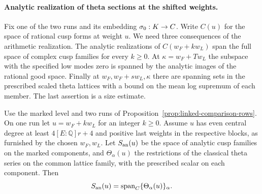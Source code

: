 \paragraph{Analytic realization of theta sections at the shifted weights.}\label{par:shifted-theta}
Fix one of the two runs and its embedding \(\sigma_0:K\to\C\).
Write \(C(u)\) for the space of rational cusp forms at weight \(u\).
We need three consequences of the arithmetic realization. The analytic realizations of \(C(w_F+k w_L)\) span the full space of complex cusp families for
every \(k\ge0\). At \(\kappa=w_F+T w_L\) the subspace with the
specified low modes zero is spanned by the analytic images of the rational good space. Finally at \(w_F,w_F+s w_L,\kappa\) there are spanning
sets in the prescribed scaled theta lattices with a bound on the mean
log supremum of each member. The last assertion is a size estimate.

\begin{proposition}\label{prop:shifted-component-span}
Use the marked level and two runs of
Proposition~\ref{prop:linked-comparison-rows}. On one run let
\(u=w_F+k w_L\) for an integer \(k\ge0\). Assume \(u\) has
even central degree at least \(4[E:\mathbb Q]r+4\) and
positive last weights in the respective blocks, as furnished
by the chosen \(w_F,w_L\). Let \(S_{\rm an}(u)\) be the space of analytic cusp families on the marked components, and \(\Theta_\alpha(u)\) the restrictions of the classical theta series on the common lattice family, with the prescribed scalar on each component. Then
\[
 S_{\rm an}(u)=\operatorname{span}_{\mathbb C}\{\Theta_\alpha(u)\}_\alpha.
\]

\end{proposition}

